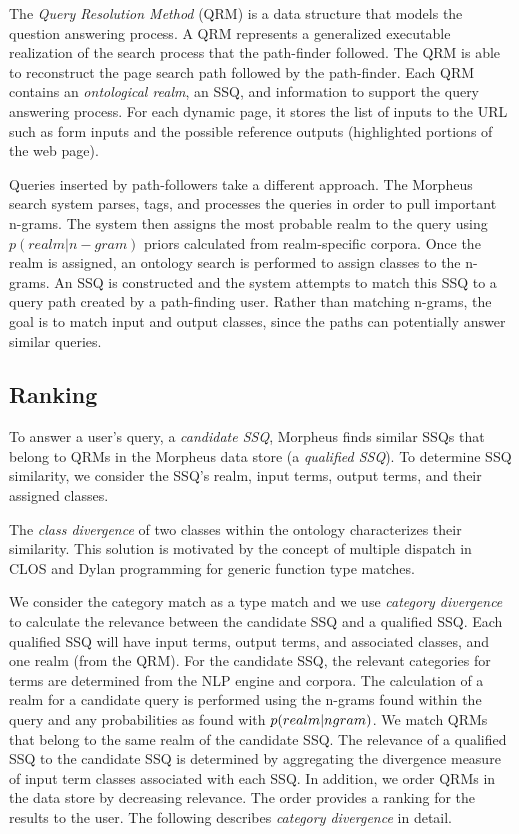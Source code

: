 The \emph{Query Resolution Method} (QRM) is a data structure that models the
question answering process. A QRM represents a generalized executable realization of the search process that the path-finder followed. The QRM is able to reconstruct the page search path followed by the path-finder. Each QRM contains an \emph{ontological realm}, an SSQ, and information to support the query answering process. For each dynamic page, it stores the list of inputs to the URL such as form inputs and the possible reference outputs (highlighted portions of the web page).



Queries inserted by path-followers take a different approach. The Morpheus search system parses, tags, and processes the queries in order to pull important n-grams. The system then assigns the most probable realm to the query using $p(realm|n-gram)$ priors calculated from realm-specific corpora. Once the realm is assigned, an ontology search is performed to assign classes to the n-grams. An SSQ is constructed and the system attempts to match this SSQ to a query path created by a path-finding user. Rather than matching n-grams, the goal is to match input and output classes, since the paths can potentially answer similar queries.


\subsection{Ranking} 
\label{sec:qrm_ranking}

To answer a user's query, a \textit{candidate
SSQ}, Morpheus finds similar SSQs that belong to QRMs in the Morpheus data store (a \textit{qualified SSQ}).  To determine SSQ similarity, we
consider the SSQ's realm, input terms, output terms, and their assigned classes. 

The \emph{class divergence} of two classes within the ontology characterizes their similarity.  This solution is motivated by the concept of multiple dispatch in CLOS and Dylan programming for generic function type matches. 

We consider the category match as a type match and we use \emph{category divergence} to calculate the relevance between the candidate SSQ and a qualified SSQ. Each qualified SSQ will have input terms, output terms, and associated classes, and one realm (from the QRM). 
For the candidate SSQ, the relevant categories for terms are determined from the NLP engine and corpora. The calculation of a realm for a candidate query is performed using the n-grams found within the query and any probabilities as found with $p(realm|n\-gram)$. %
We match QRMs that belong to the same realm of the candidate SSQ. The relevance of a qualified SSQ to the candidate SSQ is determined by aggregating the divergence measure of input term classes associated with each SSQ. In addition, we order QRMs in the data store 
by decreasing relevance. The order provides a ranking for the results 
to the user. The following describes \emph{category divergence} 
in detail.

